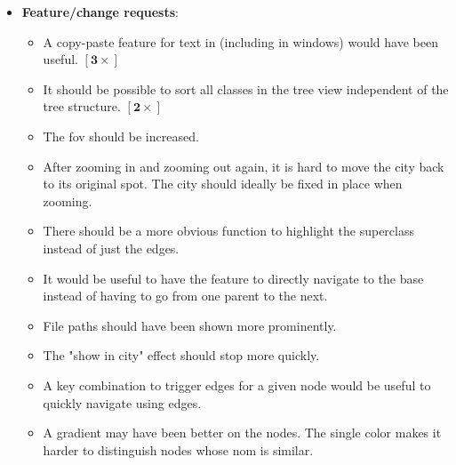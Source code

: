 \documentclass[../thesis]{subfiles}
\begin{document}
\begin{itemize}
	\item \textbf{Feature/change requests}:
	      \begin{itemize}
		      \item A copy-paste feature for text in \SEE{} (including in \glspl{window}) would have been useful. $\bm{[3\times]}$ \agree
		      \item It should be possible to sort all classes in the tree view independent of the tree structure. $\bm{[2\times]}$
		      \item The \gls{fov} should be increased.
		      \item After zooming in and zooming out again, it is hard to move the \gls{city} back to its original spot.
		            The \gls{city} should ideally be fixed in place when zooming. \agree{}
		      \item There should be a more obvious function to highlight the superclass instead of just the edges.
		      \item It would be useful to have the feature to directly navigate to the \gls{base} instead of having to go from one parent to the next.
		      \item File paths should have been shown more prominently.
		      \item The "show in city" effect should stop more quickly. \agree
		      \item A key combination to trigger edges for a given node would be useful to quickly navigate using edges.
		      \item A gradient may have been better on the nodes.
		            The single color makes it harder to distinguish nodes whose \gls{nom} is similar. \agree

\end{itemize}
\end{itemize}
\end{document}
